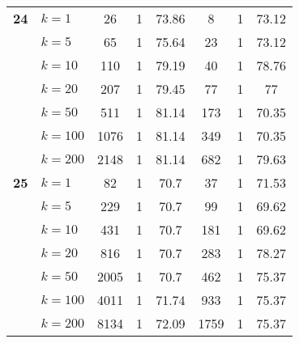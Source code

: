 \begin{table}[htbp]
\begin{tabular}{|l|l|c|c|c|c|c|c|}
    \multicolumn{1}{|r|}{\textbf{24}} & $k=1$ & 26 & 1 & 73.86 & 8 & 1 & 73.12 \\ 
     & $k=5$ & 65 & 1 & 75.64 & 23 & 1 & 73.12 \\ 
     & $k=10$ & 110 & 1 & 79.19 & 40 & 1 & 78.76 \\ 
     & $k=20$ & 207 & 1 & 79.45 & 77 & 1 & 77 \\ 
     & $k=50$ & 511 & 1 & 81.14 & 173 & 1 & 70.35 \\ 
     & $k=100$ & 1076 & 1 & 81.14 & 349 & 1 & 70.35 \\ 
     & $k=200$ & 2148 & 1 & 81.14 & 682 & 1 & 79.63 \\ \hline
    \multicolumn{1}{|r|}{\textbf{25}} & $k=1$ & 82 & 1 & 70.7 & 37 & 1 & 71.53 \\ 
     & $k=5$ & 229 & 1 & 70.7 & 99 & 1 & 69.62 \\ 
     & $k=10$ & 431 & 1 & 70.7 & 181 & 1 & 69.62 \\ 
     & $k=20$ & 816 & 1 & 70.7 & 283 & 1 & 78.27 \\ 
     & $k=50$ & 2005 & 1 & 70.7 & 462 & 1 & 75.37 \\ 
     & $k=100$ & 4011 & 1 & 71.74 & 933 & 1 & 75.37 \\ 
     & $k=200$ & 8134 & 1 & 72.09 & 1759 & 1 & 75.37 \\ \hline
    \end{tabular}
\end{table}
